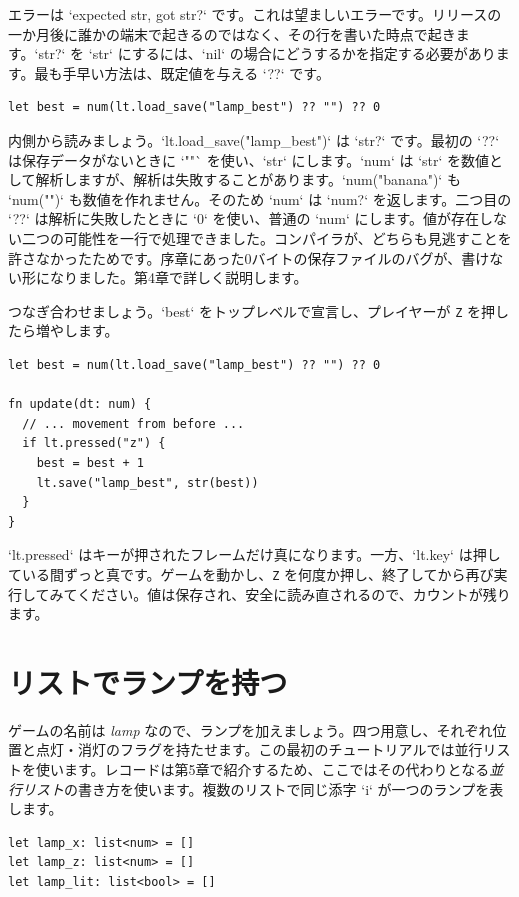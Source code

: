 \noindent
エラーは `expected str, got str?` です。これは望ましいエラーです。リリースの一か月後に誰かの端末で起きるのではなく、その行を書いた時点で起きます。`str?` を `str` にするには、`nil` の場合にどうするかを指定する必要があります。最も手早い方法は、既定値を与える `??` です。

\begin{lstlisting}[language=wick]
let best = num(lt.load_save("lamp_best") ?? "") ?? 0
\end{lstlisting}

\noindent
内側から読みましょう。`lt.load_save("lamp_best")` は `str?` です。最初の `??` は保存データがないときに `""` を使い、`str` にします。`num` は `str` を数値として解析しますが、解析は失敗することがあります。`num("banana")` も `num("")` も数値を作れません。そのため `num` は `num?` を返します。二つ目の `??` は解析に失敗したときに `0` を使い、普通の `num` にします。値が存在しない二つの可能性を一行で処理できました。コンパイラが、どちらも見逃すことを許さなかったためです。序章にあった0バイトの保存ファイルのバグが、書けない形になりました。第4章で詳しく説明します。

つなぎ合わせましょう。`best` をトップレベルで宣言し、プレイヤーが \texttt{Z} を押したら増やします。

\begin{lstlisting}[language=wick]
let best = num(lt.load_save("lamp_best") ?? "") ?? 0

fn update(dt: num) {
  // ... movement from before ...
  if lt.pressed("z") {
    best = best + 1
    lt.save("lamp_best", str(best))
  }
}
\end{lstlisting}

\noindent
`lt.pressed` はキーが押されたフレームだけ真になります。一方、`lt.key` は押している間ずっと真です。ゲームを動かし、\texttt{Z} を何度か押し、終了してから再び実行してみてください。値は保存され、安全に読み直されるので、カウントが残ります。

\section{リストでランプを持つ}

ゲームの名前は \emph{lamp} なので、ランプを加えましょう。四つ用意し、それぞれ位置と点灯・消灯のフラグを持たせます。この最初のチュートリアルでは並行リストを使います。レコードは第5章で紹介するため、ここではその代わりとなる\emph{並行リスト}の書き方を使います。複数のリストで同じ添字 `i` が一つのランプを表します。

\begin{lstlisting}[language=wick]
let lamp_x: list<num> = []
let lamp_z: list<num> = []
let lamp_lit: list<bool> = []
\end{lstlisting}

